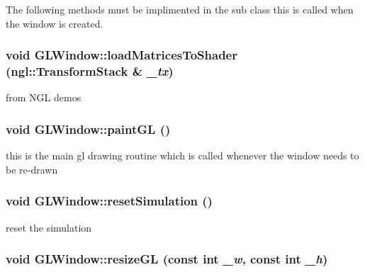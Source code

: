 The following methods must be implimented in the sub class this is called when the window is created. \hypertarget{classGLWindow_ab78209ce50dd6820686aa05fc242eb7a}{
\subsubsection[{loadMatricesToShader}]{\setlength{\rightskip}{0pt plus 5cm}void GLWindow::loadMatricesToShader (ngl::TransformStack \& {\em \_\-tx})}}
\label{classGLWindow_ab78209ce50dd6820686aa05fc242eb7a}


from NGL demos \hypertarget{classGLWindow_a9bd2503dd5f812c10a9481f22ecd3403}{
\subsubsection[{paintGL}]{\setlength{\rightskip}{0pt plus 5cm}void GLWindow::paintGL ()}}
\label{classGLWindow_a9bd2503dd5f812c10a9481f22ecd3403}


this is the main gl drawing routine which is called whenever the window needs to be re-\/drawn \hypertarget{classGLWindow_a768d9717b3f5ed181fc8817481419d50}{
\subsubsection[{resetSimulation}]{\setlength{\rightskip}{0pt plus 5cm}void GLWindow::resetSimulation ()}}
\label{classGLWindow_a768d9717b3f5ed181fc8817481419d50}


reset the simulation \hypertarget{classGLWindow_abe57c0f40e59cba4c98759121e22eb47}{
\subsubsection[{resizeGL}]{\setlength{\rightskip}{0pt plus 5cm}void GLWindow::resizeGL (const int {\em \_\-w}, \/  const int {\em \_\-h})}}
\label{classGLWindow_abe57c0f40e59cba4c98759121e22eb47}


